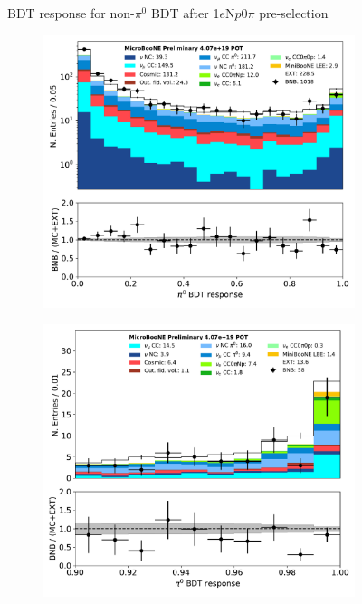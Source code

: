 \documentclass[a4paper]{article}
\newcommand{\npsel}{1$e$N$p$0$\pi$ }
\begin{document}
\begin{figure}[H]
\begin{center}
\begin{subfigure}[b]{0.45\textwidth}
    \caption{\label{fig:1eNp:bdt:nonpi0:zoom}}
    \end{subfigure}
\caption{\label{fig:1eNp:bdt:nonpi0}BDT response for non-$\pi^0$ BDT after \npsel pre-selection}
\end{center}
\end{figure}

\begin{figure}[H] 
\begin{center}
    \begin{subfigure}[b]{0.45\textwidth}
    \centering
    \includegraphics[width=1.00\textwidth]{1eNp/pi0_score_01162020_RUN1.pdf}
    \caption{\label{fig:1eNp:bdt:pi0:all}}
    \end{subfigure}
    \begin{subfigure}[b]{0.45\textwidth}
    \centering
    \includegraphics[width=1.00\textwidth]{1eNp/pi0_score_zoom_01162020_RUN1.pdf}

\end{subfigure}
\end{center}
\end{figure}
\end{document}
